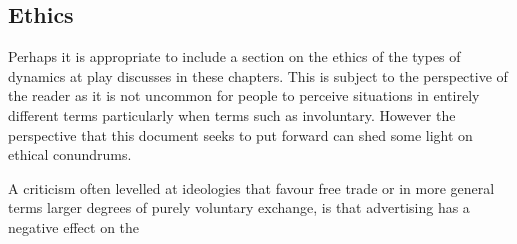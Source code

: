 \documentclass[]{article}
\begin{document}
\subsection{Ethics}
Perhaps it is appropriate to include a section on the ethics of the types of dynamics at play discusses in these chapters. This is subject to the perspective of the reader as it is not uncommon for people to perceive situations in entirely different terms particularly when terms such as involuntary. However the perspective that this document seeks to put forward can shed some light on ethical conundrums. 

A criticism often levelled at ideologies that favour free trade or in more general terms larger degrees of purely voluntary exchange, is that advertising has a negative effect on the 
\end{document}
